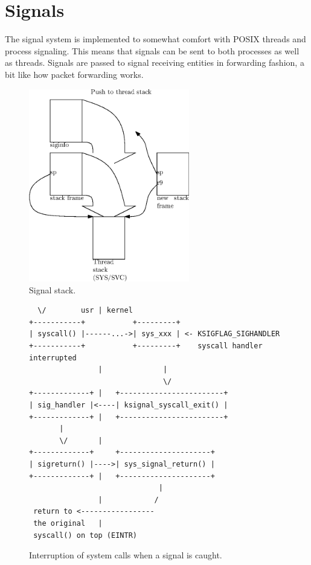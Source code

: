 \chapter{Signals}

The signal system is implemented to somewhat comfort with \acs{POSIX} threads
and process signaling. This means that signals can be sent to both processes as
well as threads. Signals are passed to signal receiving entities in forwarding
fashion, a bit like how packet forwarding works.

\begin{figure}
  \center
  \includegraphics[width=7cm]{pics/signal_stack}
  \caption{Signal stack.}
  \label{figure:sigstack}
\end{figure}

\begin{figure}
\begin{verbatim}
  \/        usr | kernel
+-----------+           +---------+
| syscall() |------...->| sys_xxx | <- KSIGFLAG_SIGHANDLER
+-----------+           +---------+    syscall handler interrupted
                |              |
                               \/
+-------------+ |   +------------------------+
| sig_handler |<----| ksignal_syscall_exit() |  
+-------------+ |   +------------------------+
       |
       \/       |
+-------------+     +---------------------+
| sigreturn() |---->| sys_signal_return() |
+-------------+ |   +---------------------+
                              |
                |            /
 return to <-----------------
 the original   |
 syscall() on top (EINTR)
\end{verbatim}
\caption{Interruption of system calls when a signal is caught.}
\label{figure:syscallint}
\end{figure}
